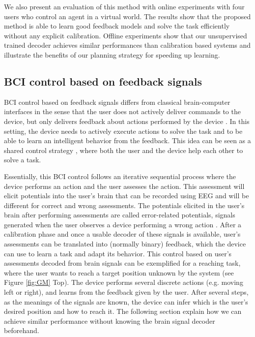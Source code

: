 We also present an evaluation of this method with online experiments with four users who control an agent in a virtual world. The results show that the proposed method is able to learn good feedback models and solve the task efficiently without any explicit calibration. Offline experiments show that our unsupervised trained decoder achieves similar performances than calibration based systems and illustrate the benefits of our planning strategy for speeding up learning.

\subsection{BCI control based on feedback signals}

BCI control based on feedback signals differs from classical brain-computer interfaces in the sense that the user does not actively deliver commands to the device, but only delivers feedback about actions performed by the device \cite{chavarriaga2010learning,iturrate13}. In this setting, the device needs to actively execute actions to solve the task and to be able to learn an intelligent behavior from the feedback. This idea can be seen as a shared control strategy \cite{millan10}, where both the user and the device help each other to solve a task.

Essentially, this BCI control follows an iterative sequential process where the device performs an action and the user assesses the action. This assessment will elicit potentials into the user's brain that can be recorded using EEG and will be different for correct and wrong assessments. The potentials elicited in the user's brain after performing assessments are called error-related potentials, signals generated when the user observes a device performing a wrong action \cite{FerrezErrores}. After a calibration phase and once a usable decoder of these signals is available, user's assessments can be translated into (normally binary) feedback, which the device can use to learn a task and adapt its behavior. 
%
This control based on user's assessments decoded from brain signals can be exemplified for a reaching task, where the user wants to reach a target position unknown by the system (see Figure \ref{fig:GM} Top). The device performs several discrete actions (e.g. moving left or right), and learns from the feedback given by the user. After several steps, as the meanings of the signals are known, the device can infer which is the user's desired position and how to reach it. The following section explain how we can achieve similar performance without knowing the brain signal decoder beforehand.

